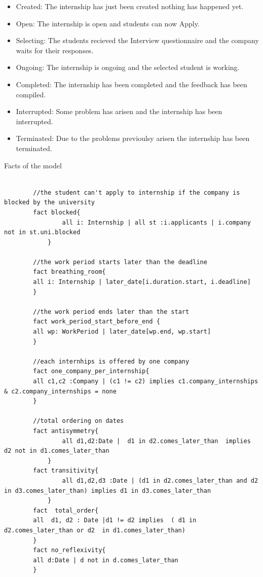 \begin{itemize}
    \item Created: The internship has just been created nothing has happened yet.
    \item Open: The internship is open and students can now Apply.
    \item Selecting: The students recieved the Interview questionnaire and the company waits for their responses.
    \item Ongoing: The internship is ongoing and the selected student is working.
    \item Completed: The internship has been completed and the feedback has been compiled.
    \item Interrupted: Some problem has arisen and the internship has been interrupted.
    \item Terminated: Due to the problems previoulsy arisen the internship has been terminated. %
\end{itemize}

\par Facts of the model

\begin{lstlisting}[language=Alloy]
                  
        //the student can't apply to internship if the company is blocked by the university
        fact blocked{
                all i: Internship | all st :i.applicants | i.company not in st.uni.blocked
            }
        
        //the work period starts later than the deadline
        fact breathing_room{
        all i: Internship | later_date[i.duration.start, i.deadline]
        }
        
        //the work period ends later than the start
        fact work_period_start_before_end {
        all wp: WorkPeriod | later_date[wp.end, wp.start]
        }
        
        //each internhips is offered by one company
        fact one_company_per_internship{
        all c1,c2 :Company | (c1 != c2) implies c1.company_internships & c2.company_internships = none
        }
        
        //total ordering on dates
        fact antisymmetry{
                all d1,d2:Date |  d1 in d2.comes_later_than  implies d2 not in d1.comes_later_than
            }
        fact transitivity{
                all d1,d2,d3 :Date | (d1 in d2.comes_later_than and d2 in d3.comes_later_than) implies d1 in d3.comes_later_than
            }
        fact  total_order{
        all  d1, d2 : Date |d1 != d2 implies  ( d1 in d2.comes_later_than or d2  in d1.comes_later_than)
        }
        fact no_reflexivity{
        all d:Date | d not in d.comes_later_than
        }
        
\end{lstlisting}

